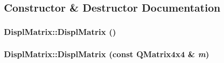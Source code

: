 \subsection{Constructor \& Destructor Documentation}
\hypertarget{class_robot_model_1_1_displ_matrix_a97463ac04605597575600274a23109de}{
\subsubsection[{DisplMatrix}]{\setlength{\rightskip}{0pt plus 5cm}DisplMatrix::DisplMatrix ()}}
\label{class_robot_model_1_1_displ_matrix_a97463ac04605597575600274a23109de}
\hypertarget{class_robot_model_1_1_displ_matrix_a6934f8d81e8e5b9c8dbcc1d6fd68c560}{
\subsubsection[{DisplMatrix}]{\setlength{\rightskip}{0pt plus 5cm}DisplMatrix::DisplMatrix (const QMatrix4x4 \& {\em m})}}
\label{class_robot_model_1_1_displ_matrix_a6934f8d81e8e5b9c8dbcc1d6fd68c560}


